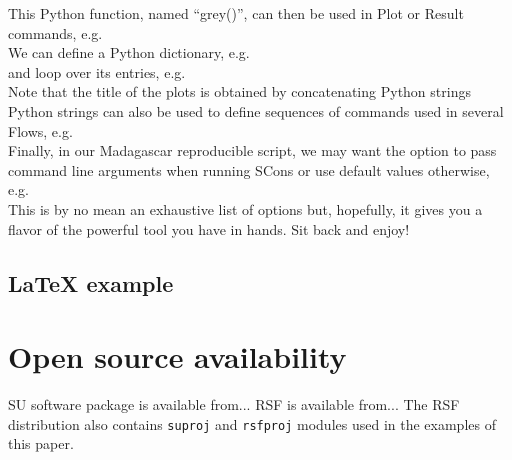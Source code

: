

This Python function, named ``grey()'', can then be used in Plot or Result
commands, e.g.\\



We can define a Python dictionary, e.g.\\



\noindent and loop over its entries, e.g.\\



Note that the title of the plots is obtained by concatenating Python
strings\\



Python strings can also be used to define sequences of commands used
in several Flows, e.g.\\



Finally, in our Madagascar reproducible script, we may want the option
to pass command line arguments when running SCons or use default
values otherwise, e.g.\\



This is by no mean an exhaustive list of options but, hopefully, it
gives you a flavor of the powerful tool you have in hands. Sit back
and enjoy!

\subsection{LaTeX example}



\section{Open source availability}

SU software package is available from... RSF is available from... The
RSF distribution also contains \texttt{suproj} and \texttt{rsfproj}
modules used in the examples of this paper.




